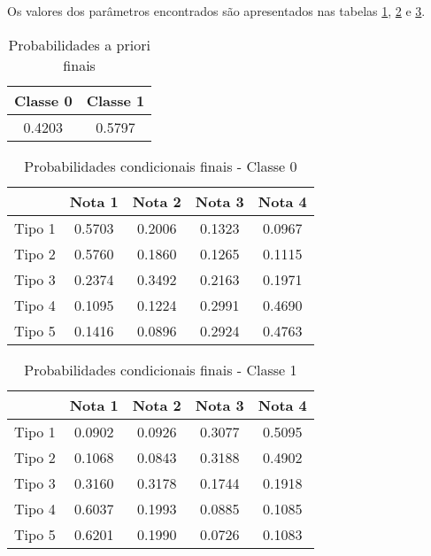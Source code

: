 \begin{enumerate}[label=(\alph*)]
    Os valores dos parâmetros encontrados são apresentados nas tabelas \ref{tab:prob_priori}, \ref{tab:prob_cond_0} e \ref{tab:prob_cond_1}.

\begin{table}[H]
    \centering
    \caption{Probabilidades a priori finais}
    \begin{tabular}{cc}
        \hline
        Classe 0 & Classe 1 \\
        \hline
        0.4203 & 0.5797 \\
        \hline
    \end{tabular}
    \label{tab:prob_priori}
\end{table}

\begin{table}[H]
    \centering
    \caption{Probabilidades condicionais finais - Classe 0}
    \begin{tabular}{c|cccc}
        \hline
        & Nota 1 & Nota 2 & Nota 3 & Nota 4 \\
        \hline
        Tipo 1 & 0.5703 & 0.2006 & 0.1323 & 0.0967 \\ 
        Tipo 2 & 0.5760 & 0.1860 & 0.1265 & 0.1115 \\ 
        Tipo 3 & 0.2374 & 0.3492 & 0.2163 & 0.1971 \\ 
        Tipo 4 & 0.1095 & 0.1224 & 0.2991 & 0.4690 \\ 
        Tipo 5 & 0.1416 & 0.0896 & 0.2924 & 0.4763 \\ 
        \hline
    \end{tabular}
    \label{tab:prob_cond_0}
\end{table}

\begin{table}[H]
    \centering
    \caption{Probabilidades condicionais finais - Classe 1}
    \begin{tabular}{c|cccc}
        \hline
        & Nota 1 & Nota 2 & Nota 3 & Nota 4 \\
        \hline
        Tipo 1 & 0.0902 & 0.0926 & 0.3077 & 0.5095 \\ 
        Tipo 2 & 0.1068 & 0.0843 & 0.3188 & 0.4902 \\ 
        Tipo 3 & 0.3160 & 0.3178 & 0.1744 & 0.1918 \\ 
        Tipo 4 & 0.6037 & 0.1993 & 0.0885 & 0.1085 \\ 
        Tipo 5 & 0.6201 & 0.1990 & 0.0726 & 0.1083 \\ 
        \hline
    \end{tabular}
    \label{tab:prob_cond_1}
\end{table}


\end{enumerate}
